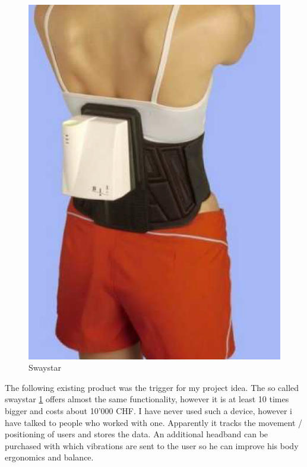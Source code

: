 \begin{figure}
  \begin{center}
\includegraphics[width=\linewidth]{images/Swaystar_01.png}
  \end{center}
  \caption{\label{fig:swaystar}Swaystar}
\end{figure}

The following existing product was the trigger for my project idea. The so called swaystar \ref{fig:swaystar} offers almost the same functionality, however it is at least 10 times bigger and costs about 10'000 CHF. 
I have never used such a device, however i have talked to people who worked with one. Apparently it tracks the movement / positioning of users and stores the data. An additional headband can be purchased with which vibrations are sent to the user so he can improve his body ergonomics and balance. 

